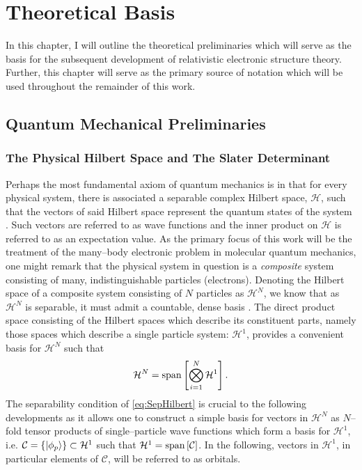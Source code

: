\chapter{Theoretical Basis}
\label{ch:Theory}

In this chapter, I will outline the theoretical preliminaries which will serve as the basis
for the subsequent development of relativistic electronic structure theory. Further, this
chapter will serve as the primary source of notation which will be used throughout the
remainder of this work. 

\section{Quantum Mechanical Preliminaries}
\label{sec:QM}

\subsection{The Physical Hilbert Space and The Slater Determinant}
\label{sec:SD}

Perhaps the most fundamental axiom of quantum mechanics is in that for every physical
system, there is associated a separable complex Hilbert space, $\mathcal{H}$, such that
the vectors of said Hilbert space represent the quantum states 
of the system \cite{VonNeumann55_book}. Such vectors are referred to as wave functions
and the inner product on $\mathcal{H}$ is referred to as an expectation value.
As the primary focus of this work will be the treatment of the many--body electronic
problem in molecular quantum mechanics, one might remark that the physical system
in question is a \emph{composite} system consisting of many, indistinguishable 
particles (electrons). Denoting the Hilbert space of a composite system consisting
of $N$ particles as $\mathcal{H}^N$, we know that as $\mathcal{H}^N$ is separable,
it must admit a countable, dense basis \cite{Lee03_book}.
The direct product space consisting of the Hilbert spaces
which describe its constituent parts, namely those spaces which describe a
single particle system: $\mathcal{H}^1$, provides a convenient basis for $\mathcal{H}^N$ such that
\begin{equation}
  \label{eq:SepHilbert}
  \mathcal{H}^N = \mathrm{span}\left[ \bigotimes_{i = 1}^N \mathcal{H}^1 \right].
\end{equation}
The separability condition of \cref{eq:SepHilbert} is crucial to the following developments
as it allows one to construct a simple basis for vectors in $\mathcal{H}^N$
as $N$--fold tensor products of single--particle wave functions which form a basis for $\mathcal{H}^1$, 
i.e. $\mathcal{C} = \left \lbrace \left\vert \phi_p \right\rangle \right\rbrace  \subset \mathcal{H}^1$ such that 
$\mathcal{H}^1 = \mathrm{span}\left[ \mathcal{C} \right]$. In the following, vectors in $\mathcal{H}^1$, in particular elements of $\mathcal{C}$,
will be referred to as orbitals.

